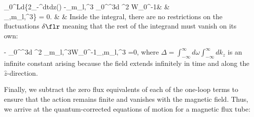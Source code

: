 \ba 
\label{eqn:varAct}
\int_0^{L\rho}d\rho\biggr\{2\pi\int_{-\infty}^\infty dtdz\left(\right) 
	-\sum_{m_l,\sigma^3} \int_{0}^\infty \chi^3d\chi 
	 \rho^2  W_0^{-1}& &\nonumber \\
	 \times {}_{\chi,m_l,\sigma^3}\delta \flr\biggr\} = 0. & &
\ea 
Inside the integral, there are no restrictions on the fluctuations $\delta \flr$
meaning that the rest of the integrand must vanish on its own:



\ba 
\label{eqn:stationary}
	-\frac{\hbar}{2\Delta} \int_{0}^\infty \chi^3d\chi 
	 \rho^2 
	 \sum_{m_l,\sigma^3}W_0^{-1}_{\chi,m_l,\sigma^3} =0,
\ea 
where $\Delta=\int_{-\infty}^{\infty}d\omega \int_{-\infty}^{\infty}dk_z$ is an infinite constant
arising because the field extends infinitely in time and along the $\hat{z}$-direction.

Finally, we subtract the zero flux 
equivalents of each of the one-loop terms to ensure that the action 
remains finite and vanishes with the magnetic field. Thus, we arrive at the 
 quantum-corrected equations of motion for a magnetic flux tube:

